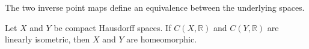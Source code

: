 \begin{definition}
\label{def:banach-stone-point-equiv}
\leanok
{}
The two inverse point maps define an equivalence between the underlying spaces.
\end{definition}

\begin{theorem}
\label{thm:banach-stone}
\leanok
{}
Let $X$ and $Y$ be compact Hausdorff spaces.  If $C(X,\mathbb R)$ and
$C(Y,\mathbb R)$ are linearly isometric, then $X$ and $Y$ are homeomorphic.
\end{theorem}
